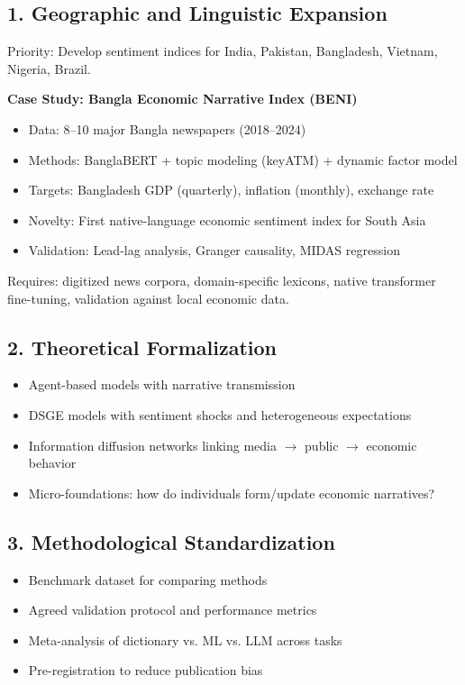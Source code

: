 \documentclass[11pt]{article}
\begin{document}
\subsection{1. Geographic and Linguistic Expansion}

Priority: Develop sentiment indices for India, Pakistan, Bangladesh, Vietnam, Nigeria, Brazil.

\textbf{Case Study: Bangla Economic Narrative Index (BENI)}
\begin{itemize}
\item Data: 8--10 major Bangla newspapers (2018--2024)
\item Methods: BanglaBERT + topic modeling (keyATM) + dynamic factor model
\item Targets: Bangladesh GDP (quarterly), inflation (monthly), exchange rate
\item Novelty: First native-language economic sentiment index for South Asia
\item Validation: Lead-lag analysis, Granger causality, MIDAS regression
\end{itemize}

Requires: digitized news corpora, domain-specific lexicons, native transformer fine-tuning, validation against local economic data.

\subsection{2. Theoretical Formalization}

\begin{itemize}
\item Agent-based models with narrative transmission
\item DSGE models with sentiment shocks and heterogeneous expectations  
\item Information diffusion networks linking media $\to$ public $\to$ economic behavior
\item Micro-foundations: how do individuals form/update economic narratives?
\end{itemize}

\subsection{3. Methodological Standardization}

\begin{itemize}
\item Benchmark dataset for comparing methods
\item Agreed validation protocol and performance metrics
\item Meta-analysis of dictionary vs. ML vs. LLM across tasks
\item Pre-registration to reduce publication bias
\end{itemize}
\end{document}
